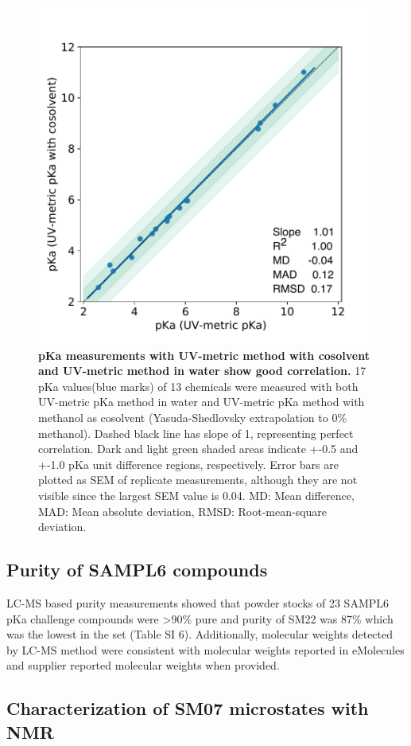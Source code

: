 \documentclass[9pt,lineno]{elife}
\begin{document}
\begin{figure}
\begin{center}
\includegraphics[width=0.5\linewidth]{figures/water_vs_cosolvent_pKa_values_correlation_figure.pdf}
\caption{{\bf pKa measurements with UV-metric method with cosolvent and UV-metric method in water show good correlation.} 
17 pKa values(blue marks) of 13 chemicals were measured with both UV-metric pKa method in water and UV-metric pKa method with methanol as cosolvent (Yasuda-Shedlovsky extrapolation to 0\% methanol). Dashed black line has slope of 1, representing perfect correlation.  Dark and light green shaded areas indicate +-0.5 and +-1.0 pKa unit difference regions, respectively. Error bars are plotted as SEM of replicate measurements, although they are not visible since the largest SEM value is 0.04. MD: Mean difference, MAD: Mean absolute deviation, RMSD: Root-mean-square deviation.  
}
\label{fig:water_vs_cosolvent_pKa_correlation}
\end{center}
\end{figure}

\subsection{Purity of SAMPL6 compounds}
LC-MS based purity measurements showed that powder stocks of 23 SAMPL6 pKa challenge compounds were >90\% pure and purity of SM22 was 87\% which was the lowest in the set (Table SI 6).  Additionally, molecular weights detected by LC-MS method were consistent with molecular weights reported in eMolecules and supplier reported molecular weights when provided. 
\subsection{Characterization of SM07 microstates with NMR}
\end{document}
